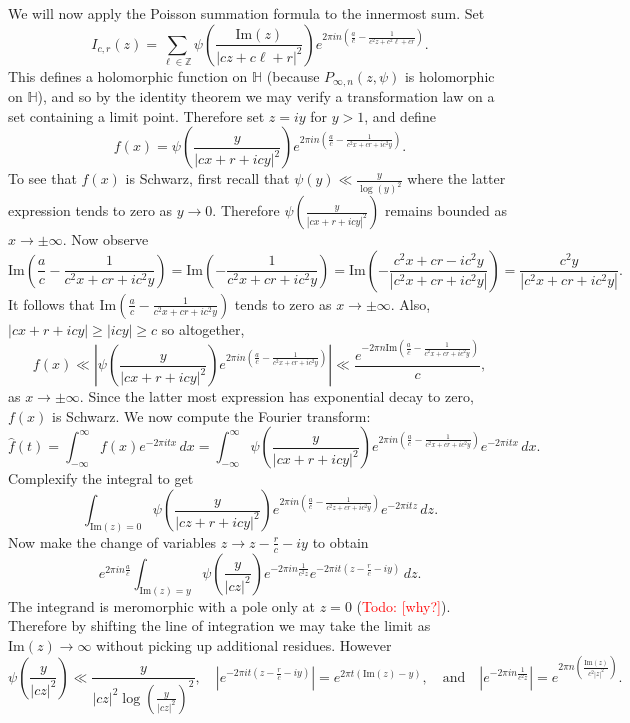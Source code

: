 \documentclass[12pt]{book}
\theoremstyle{definition}\newframedtheorem{method}{Method}
\newcommand{\Z}{\mathbb{Z}}
\renewcommand{\H}{\mathbb{H}}
\newcommand{\<}{\langle}
\renewcommand{\>}{\rangle}
\renewcommand{\Im}{\mathrm{Im}}
\newcommand{\todo}[1]{\textcolor{red}{\sf Todo: [#1]}}
\begin{document}
      We will now apply the Poisson summation formula to the innermost sum. Set
      \[
        I_{c,r}(z) = \sum_{\ell \in \Z}\psi\left(\frac{\Im(z)}{|cz+c\ell+r|^{2}}\right)e^{2\pi in\left(\frac{a}{c}-\frac{1}{c^{2}z+c^{2}\ell+cr}\right)}.
      \]
      This defines a holomorphic function on $\H$ (because $P_{\infty,n}(z,\psi)$ is holomorphic on $\H$), and so by the identity theorem we may verify a transformation law on a set containing a limit point. Therefore set $z = iy$ for $y > 1$, and define
      \[
        f(x) = \psi\left(\frac{y}{|cx+r+icy|^{2}}\right)e^{2\pi in\left(\frac{a}{c}-\frac{1}{c^{2}x+cr+ic^{2}y}\right)}.
      \]
      To see that $f(x)$ is Schwarz, first recall that $\psi(y) \ll \frac{y}{\log(y)^{2}}$ where the latter expression tends to zero as $y \to 0$. Therefore $\psi\left(\frac{y}{|cx+r+icy|^{2}}\right)$ remains bounded as $x \to \pm\infty$. Now observe
      \[
        \Im\left(\frac{a}{c}-\frac{1}{c^{2}x+cr+ic^{2}y}\right) = \Im\left(-\frac{1}{c^{2}x+cr+ic^{2}y}\right) = \Im\left(-\frac{c^{2}x+cr-ic^{2}y}{|c^{2}x+cr+ic^{2}y|}\right) = \frac{c^{2}y}{|c^{2}x+cr+ic^{2}y|}.
      \]
      It follows that $\Im\left(\frac{a}{c}-\frac{1}{c^{2}x+cr+ic^{2}y}\right)$ tends to zero as $x \to \pm \infty$. Also, $|cx+r+icy| \ge |icy| \ge c$ so altogether,
      \[
        f(x) \ll \left|\psi\left(\frac{y}{|cx+r+icy|^{2}}\right)e^{2\pi in\left(\frac{a}{c}-\frac{1}{c^{2}x+cr+ic^{2}y}\right)}\right| \ll \frac{e^{-2\pi n\Im\left(\frac{a}{c}-\frac{1}{c^{2}x+cr+ic^{2}y}\right)}}{c},
      \]
      as $x \to \pm\infty$. Since the latter most expression has exponential decay to zero, $f(x)$ is Schwarz. We now compute the Fourier transform:
      \[
        \hat{f}(t) = \int_{-\infty}^{\infty}f(x)e^{-2\pi itx}\,dx = \int_{-\infty}^{\infty}\psi\left(\frac{y}{|cx+r+icy|^{2}}\right)e^{2\pi in\left(\frac{a}{c}-\frac{1}{c^{2}x+cr+ic^{2}y}\right)}e^{-2\pi itx}\,dx.
      \]
      Complexify the integral to get
      \[
        \int_{\Im(z) = 0}\psi\left(\frac{y}{|cz+r+icy|^{2}}\right)e^{2\pi in\left(\frac{a}{c}-\frac{1}{c^{2}z+cr+ic^{2}y}\right)}e^{-2\pi itz}\,dz.
      \]
      Now make the change of variables $z \to z-\frac{r}{c}-iy$ to obtain
      \[
        e^{2\pi in\frac{a}{c}}\int_{\Im(z) = y}\psi\left(\frac{y}{|cz|^{2}}\right)e^{-2\pi in\frac{1}{c^{2}z}}e^{-2\pi it\left(z-\frac{r}{c}-iy\right)}\,dz.
      \]
      The integrand is meromorphic with a pole only at $z = 0$ (\todo{why?}). Therefore by shifting the line of integration we may take the limit as $\Im(z) \to \infty$ without picking up additional residues. However
      \[
        \psi\left(\frac{y}{|cz|^{2}}\right) \ll \frac{y}{|cz|^{2}\log\left(\frac{y}{|cz|^{2}}\right)^{2}}, \quad \left|e^{-2\pi it\left(z-\frac{r}{c}-iy\right)}\right| = e^{2\pi t(\Im(z)-y)}, \quad \text{and} \quad \left|e^{-2\pi in\frac{1}{c^{2}z}}\right| = e^{2\pi n\left(\frac{\Im(z)}{c^{2}|z|^{2}}\right)}.
      \]
\end{document}

